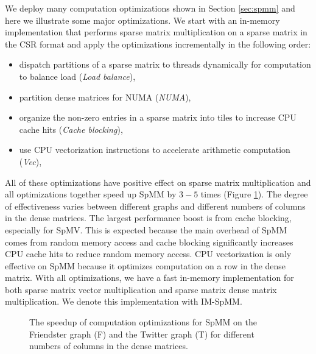 We deploy many computation optimizations shown in Section \ref{sec:spmm} and
here we illustrate some major optimizations. We start with an in-memory
implementation that
performs sparse matrix multiplication on a sparse matrix in the CSR format
and apply the optimizations incrementally in the following order:
\begin{itemize} \itemsep1pt \parskip0pt 
	\item dispatch partitions of a sparse matrix to threads dynamically for
		computation to balance load (\textit{Load balance}),
	\item partition dense matrices for NUMA (\textit{NUMA}),
	\item organize the non-zero entries in a sparse matrix into tiles to
		increase CPU cache hits (\textit{Cache blocking}),
	\item use CPU vectorization instructions to accelerate arithmetic
		computation (\textit{Vec}),
\end{itemize}

All of these optimizations have positive effect on sparse matrix
multiplication and all optimizations together speed up SpMM by $3-5$ times
(Figure \ref{perf:spmm_opt}). The degree of effectiveness
varies between different graphs and different numbers of columns in
the dense matrices. The largest performance boost is from cache blocking,
especially for SpMV.
This is expected because the main overhead of SpMM comes from random memory
access and cache blocking significantly increases CPU cache hits to reduce
random memory access. CPU vectorization is only effective on SpMM because
it optimizes computation on a row in the dense matrix.
With all optimizations, we have a fast in-memory implementation for both
sparse matrix vector multiplication and sparse matrix dense matrix multiplication.
We denote this implementation with IM-SpMM.

\begin{figure}
	\begin{center}
		\footnotesize
		
		\caption{The speedup of computation optimizations for SpMM on the Friendster
			graph (F) and the Twitter graph (T) for different numbers of
			columns in the dense matrices.}
		\label{perf:spmm_opt}
	\end{center}
\end{figure}

